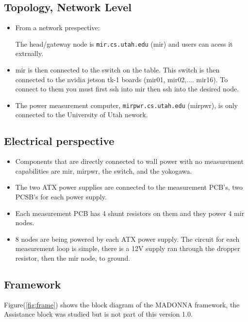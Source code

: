 \documentclass[letterpaper, 10 pt, conference]{ieeeconf}
\begin{document}
\subsection{Topology, Network Level}

\begin{itemize}

  \item From a network prespective:

The head/gateway node is \verb|mir.cs.utah.edu| (mir) and users can acess it extrnally. 

\item mir is then connected to the switch on the table. This switch is then connected to the nvidia jetson tk-1 boards (mir01, mir02,.... mir16). To connect to them you must first ssh into mir then ssh into the desired node.

\item The power measurement computer, \verb|mirpwr.cs.utah.edu| (mirpwr), is only connected to the University of Utah nework.

\end{itemize}

\subsection{Electrical perspective}

\begin{itemize}
  \item Components that are directly connected to wall power with no measurement capabilities are mir, mirpwr, the switch, and the yokogawa.

  \item The two ATX power supplies are connected to the measurement PCB's, two PCSB's for each power supply. 
  \item Each measurement PCB has 4 shunt resistors on them and they power 4 mir nodes. 
  \item 8 nodes are being powered by each ATX power supply. The circuit for each measurement loop is simple, 
        there is a 12V supply ran through the dropper resistor, then the mir node, to ground.

\end{itemize}
\subsection{Framework}

Figure(\ref{fig:frame}) shows the block diagram of the MADONNA framework, the Assistance
block was studied but is not part of this version 1.0.
\end{document}
